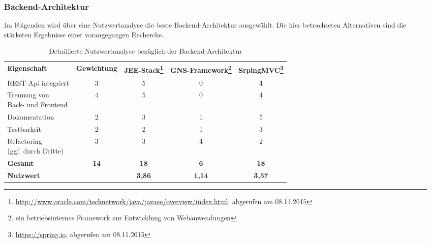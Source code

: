 \label{app:nutzwertanalyse}

\subsubsection{Backend-Architektur}

Im Folgenden wird über eine Nutzwertanalyse die beste Backend-Architektur ausgewählt.
Die hier betrachteten Alternativen sind die stärksten Ergebnisse einer vorangegangen Recherche. 

\begin{savenotes}
\begin{table}[H]
	\centering
	\begin{tabular}{lcccc}

		\rowcolor{white!15}				
		\textbf{Eigenschaft} 			& \textbf{Gewichtung}
			& \textbf{JEE-Stack\footnote{\url{http://www.oracle.com/technetwork/java/javaee/overview/index.html}, abgerufen am 08.11.2015}}
			& \textbf{GNS-Framework\footnote{ein betriebsinternes Framework zur Entwicklung von Webanwendungen}}
			& \textbf{SrpingMVC\footnote{\url{https://spring.io}, abgerufen am 08.11.2015}} \\\hline		
		
		REST-Api integriert				& 3						& 5						& 0							& 4 \\
		\pbox{4cm}{Trennung von \\ Back- und Frontend}	& 4						& 5						& 0							& 4 \\						
		Dokumentation					& 2						& 3						& 1							& 5 \\
		Testbarkeit						& 2						& 2						& 1							& 3 \\
		\pbox{4cm}{Refactoring \\(ggf. durch Dritte)}	& 3						& 3						& 4							& 2 \\
		
		\rowcolor{MidnightBlue!15}
		\textbf{Gesamt}				& \textbf{14}			& \textbf{18}			& \textbf{6}				& \textbf{18} \\\hline
		\rowcolor{white!15}				
		\textbf{Nutzwert} 				& 						& \textbf{3,86}			& \textbf{1,14} 			& \textbf{3,57} \\
											
			    
	\end{tabular}
	
	\caption{Detaillierte Nutzwertanalyse bezüglich der Backend-Architektur}
	\label{tab:nutzwertanalyse_backend}
\end{table}
\end{savenotes}


